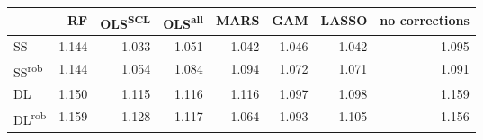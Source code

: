 \begin{tabular}{lrrrrrrr}
\toprule
 & RF & OLS\textsuperscript{SCL} & OLS\textsuperscript{all} & MARS & GAM & LASSO & no corrections \\
\midrule
SS & {\cellcolor[HTML]{1C1C1C}} \color[HTML]{F1F1F1} 1.144 & {\cellcolor[HTML]{F1F1F1}} \color[HTML]{000000} 1.033 & {\cellcolor[HTML]{CFCFCF}} \color[HTML]{000000} 1.051 & {\cellcolor[HTML]{E0E0E0}} \color[HTML]{000000} 1.042 & {\cellcolor[HTML]{D8D8D8}} \color[HTML]{000000} 1.046 & {\cellcolor[HTML]{E0E0E0}} \color[HTML]{000000} 1.042 & {\cellcolor[HTML]{7B7B7B}} \color[HTML]{F1F1F1} 1.095 \\
SS\textsuperscript{rob} & {\cellcolor[HTML]{1C1C1C}} \color[HTML]{F1F1F1} 1.144 & {\cellcolor[HTML]{C9C9C9}} \color[HTML]{000000} 1.054 & {\cellcolor[HTML]{8F8F8F}} \color[HTML]{F1F1F1} 1.084 & {\cellcolor[HTML]{7D7D7D}} \color[HTML]{F1F1F1} 1.094 & {\cellcolor[HTML]{A6A6A6}} \color[HTML]{F1F1F1} 1.072 & {\cellcolor[HTML]{A8A8A8}} \color[HTML]{F1F1F1} 1.071 & {\cellcolor[HTML]{828282}} \color[HTML]{F1F1F1} 1.091 \\
DL & {\cellcolor[HTML]{111111}} \color[HTML]{F1F1F1} 1.150 & {\cellcolor[HTML]{545454}} \color[HTML]{F1F1F1} 1.115 & {\cellcolor[HTML]{525252}} \color[HTML]{F1F1F1} 1.116 & {\cellcolor[HTML]{525252}} \color[HTML]{F1F1F1} 1.116 & {\cellcolor[HTML]{767676}} \color[HTML]{F1F1F1} 1.097 & {\cellcolor[HTML]{747474}} \color[HTML]{F1F1F1} 1.098 & {\cellcolor[HTML]{000000}} \color[HTML]{F1F1F1} 1.159 \\
DL\textsuperscript{rob} & {\cellcolor[HTML]{000000}} \color[HTML]{F1F1F1} 1.159 & {\cellcolor[HTML]{3A3A3A}} \color[HTML]{F1F1F1} 1.128 & {\cellcolor[HTML]{505050}} \color[HTML]{F1F1F1} 1.117 & {\cellcolor[HTML]{B6B6B6}} \color[HTML]{000000} 1.064 & {\cellcolor[HTML]{7E7E7E}} \color[HTML]{F1F1F1} 1.093 & {\cellcolor[HTML]{676767}} \color[HTML]{F1F1F1} 1.105 & {\cellcolor[HTML]{060606}} \color[HTML]{F1F1F1} 1.156 \\
\bottomrule
\end{tabular}
